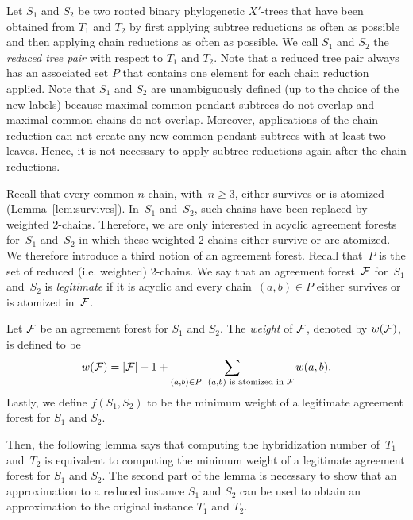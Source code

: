 Let $S_1$ and $S_2$ be two rooted binary phylogenetic $X'$-trees that have been obtained from $T_1$ and $T_2$ by first applying subtree reductions as often as possible and then applying chain reductions as often as possible. We call $S_1$ and $S_2$ the {\it reduced tree pair} with respect to  $T_1$ and $T_2$. Note that a reduced tree pair always has an associated set $P$ that contains one element for each chain reduction applied. Note that $S_1$ and $S_2$ are unambiguously defined (up to the choice of the new labels) because maximal common pendant subtrees do not overlap and maximal common chains do not overlap. Moreover, applications of the chain reduction can not create any new common pendant subtrees with at least two leaves. Hence, it is not necessary to apply subtree reductions again after the chain reductions.

Recall that every common $n$-chain, with~$n\geq 3$, either survives or is atomized (Lemma~\ref{lem:survives}). In~$S_1$ and~$S_2$, such chains have been replaced by weighted 2-chains. Therefore, we are only interested in acyclic agreement forests for~$S_1$ and~$S_2$ in which these weighted 2-chains either survive or are atomized. We therefore introduce a third notion of an agreement forest. Recall that~$P$ is the set of reduced (i.e. weighted) 2-chains. We say that an agreement forest~${\mathcal F}$ for~$S_1$ and~$S_2$ is {\it legitimate} if it is acyclic and every chain~$(a,b)\in P$ either survives or is atomized in~${\mathcal F}$.

\noindent Let ${\mathcal F}$ be an agreement forest for $S_1$ and $S_2$. The {\it weight} of ${\mathcal F}$, denoted by $w({\mathcal F})$, is defined to be
\[w({\mathcal F})=|{\mathcal F}|-1+\sum_{(a,b)\in P: \mbox{ }(a,b)\textnormal{ is atomized in }{\mathcal F}} w(a,b). \]
Lastly, we define $f(S_1,S_2)$ to be the minimum weight of a legitimate agreement forest for $S_1$ and $S_2$.

Then, the following lemma says that computing the hybridization number of~$T_1$ and~$T_2$ is equivalent to computing the minimum weight of a legitimate agreement forest for $S_1$ and $S_2$. The second part of the lemma is necessary to show that an approximation to a reduced instance $S_1$ and $S_2$ can be used to obtain an approximation to the original instance $T_1$ and $T_2$.

